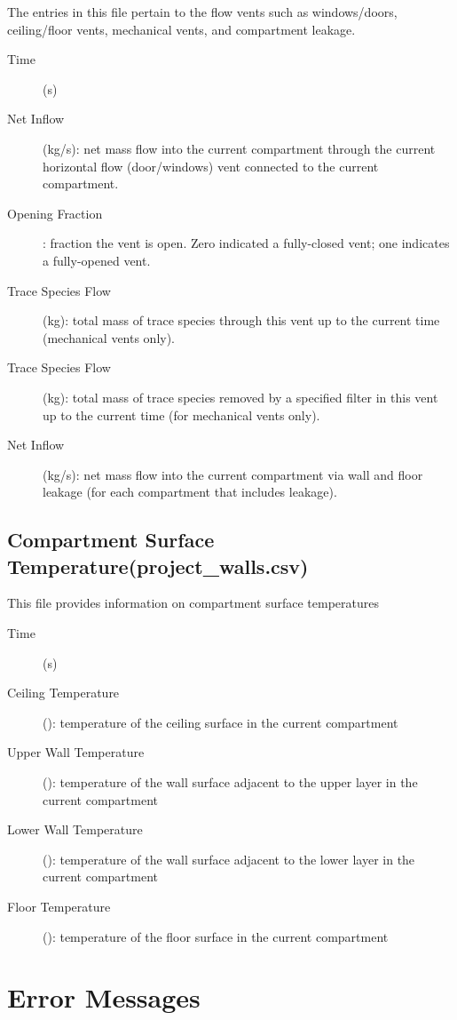 The entries in this file pertain to the flow vents such as windows/doors, ceiling/floor vents, mechanical vents, and compartment leakage.
\begin{description}
\item[Time] (s)
\item[Net Inflow] (kg/s): net mass flow into the current compartment through the current horizontal flow (door/windows) vent connected to the current compartment.
\item[Opening Fraction]: fraction the vent is open. Zero indicated a fully-closed vent; one indicates a fully-opened vent.
\item[Trace Species Flow] (kg): total mass of trace species through this vent up to the current time (mechanical vents only).
\item[Trace Species Flow] (kg): total mass of trace species removed by a specified filter in this vent up to the current time (for mechanical vents only).
\item[Net Inflow] (kg/s): net mass flow into the current compartment via wall and floor leakage (for each compartment that includes leakage).
\end{description}

\subsection{Compartment Surface Temperature(project\_walls.csv)}

This file provides information on compartment surface temperatures
\begin{description}
\item[Time] (s)
\item[Ceiling Temperature] (\degc): temperature of the ceiling surface in the current compartment
\item[Upper Wall Temperature] (\degc): temperature of the wall surface adjacent to the upper layer in the current compartment
\item[Lower Wall Temperature] (\degc): temperature of the  wall surface adjacent to the lower layer in the current compartment
\item[Floor Temperature] (\degc): temperature of the floor surface in the current compartment
\end{description}

\newpage

\section{Error Messages}

